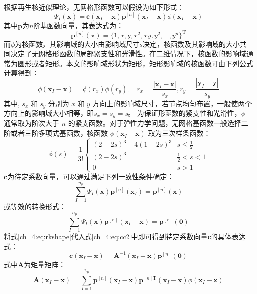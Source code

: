 根据再生核近似理论\cite{liu1995}，无网格形函数可以假设为如下形式：
\begin{equation}\label{ch_4:eq:rkshape}
    \Psi_I(\boldsymbol x) = \boldsymbol c(\boldsymbol x_I-\boldsymbol x) \boldsymbol p^{[n]}(\boldsymbol x_I-\boldsymbol x) \phi(\boldsymbol x_I - \boldsymbol x)
\end{equation}
其中$\boldsymbol p$为$n$阶基函数向量，其表达式为：
\begin{equation}
    \boldsymbol p^{[n]}(\boldsymbol x) = \{ 1, x, y, x^2, xy, y^2,...,y^n\}^\mathrm{T}
\end{equation}
而$\phi$为核函数，其影响域的大小由影响域尺寸$s$决定，核函数及其影响域的大小共同决定了无网格形函数的局部紧支性和光滑性。在二维情况下，核函数的影响域通常为圆形或者矩形。本文的影响域形状为矩形，矩形影响域的核函数可由下列公式计算得到：
\begin{equation}
    \phi(\boldsymbol x_I-\boldsymbol x) = \phi(r_x) \phi(r_y), \quad r_x = \frac{|\boldsymbol x_I - \boldsymbol x|}{s_{x}},r_y = \frac{|\boldsymbol y_I - \boldsymbol y|}{s_{y}}
\end{equation}
其中, $s_x$ 和 $s_y$ 分别为 $x$ 和 $y$ 方向上的影响域尺寸，若节点均匀布置，一般使两个方向上的影响域大小相等，即$s_x = s_y = s$。
为保证形函数的紧支性和光滑性，$\phi$ 通常取为阶次大于 $n$ 的紧支函数。对于弹性力学问题，无网格基函数一般选择二阶或者三阶多项式基函数，核函数 $\phi(\boldsymbol x_I-\boldsymbol x)$ 取为三次样条函数：
\begin{equation}
    \phi(s) =\frac{1}{3!} \begin{cases}
        (2-2s)^3 - 4(1-2s)^3 & s\le\frac{1}{2} \\
        (2-2s)^3 &\frac{1}{2}<s<1 \\
        0 & s> 1
    \end{cases}
\end{equation}
$\boldsymbol c$为待定系数向量，可以通过满足下列一致性条件确定：
\begin{equation}\label{ch_4:eq:cc1}
    \sum_{I=1}^{n_p}\Psi_I(\boldsymbol x) \boldsymbol p^{[n]}(\boldsymbol x_I) = \boldsymbol p^{[n]} (\boldsymbol x)
\end{equation}
或等效的转换形式：
\begin{equation}\label{ch_4:eq:cc2}
    \sum_{I=1}^{n_p}\Psi_I(\boldsymbol x) \boldsymbol p^{[n]}(\boldsymbol x_I-\boldsymbol x) = \boldsymbol p^{[n]} (\boldsymbol 0)
\end{equation}
将式\eqref{ch_4:eq:rkshape}代入式\eqref{ch_4:eq:cc2}中即可得到待定系数向量$\boldsymbol c$的具体表达式：
\begin{equation}\label{ch_4:eq:correction}
    \boldsymbol c(\boldsymbol x_I-\boldsymbol x) = \boldsymbol A^{-1}(\boldsymbol x_I-\boldsymbol x)\boldsymbol p^{[n]}(\boldsymbol 0)
\end{equation}
式中$\boldsymbol A$为矩量矩阵：
\begin{equation}
    \boldsymbol A(\boldsymbol x_I-\boldsymbol x) = \sum_{I=1}^{n_p}\boldsymbol p^{[n]}(\boldsymbol x_I-\boldsymbol x) \boldsymbol p^{[n]\mathrm{T}}(\boldsymbol x_I-\boldsymbol x)\phi(\boldsymbol x_I-\boldsymbol x)
\end{equation}

